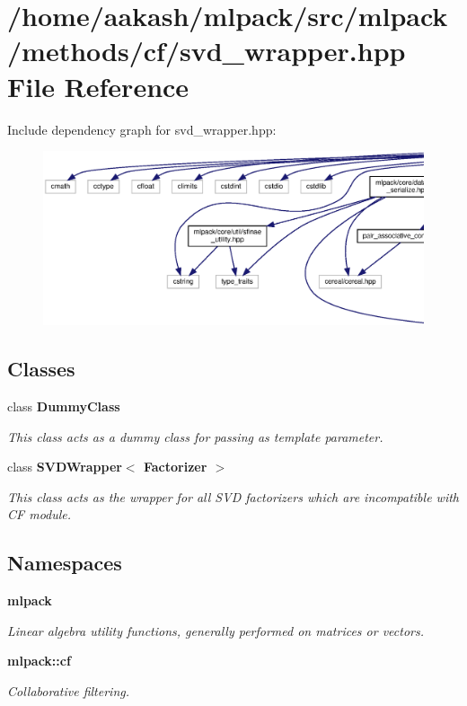 \section{/home/aakash/mlpack/src/mlpack/methods/cf/svd\+\_\+wrapper.hpp File Reference}
\label{svd__wrapper_8hpp}
Include dependency graph for svd\+\_\+wrapper.\+hpp\+:
\nopagebreak
\begin{figure}[H]
\begin{center}
\leavevmode
\includegraphics[width=350pt]{svd__wrapper_8hpp__incl}
\end{center}
\end{figure}
\subsection*{Classes}
\begin{DoxyCompactItemize}
\item 
class \textbf{ Dummy\+Class}
\begin{DoxyCompactList}\small\item\em This class acts as a dummy class for passing as template parameter. \end{DoxyCompactList}\item 
class \textbf{ S\+V\+D\+Wrapper$<$ Factorizer $>$}
\begin{DoxyCompactList}\small\item\em This class acts as the wrapper for all S\+VD factorizers which are incompatible with CF module. \end{DoxyCompactList}\end{DoxyCompactItemize}
\subsection*{Namespaces}
\begin{DoxyCompactItemize}
\item 
 \textbf{ mlpack}
\begin{DoxyCompactList}\small\item\em Linear algebra utility functions, generally performed on matrices or vectors. \end{DoxyCompactList}\item 
 \textbf{ mlpack\+::cf}
\begin{DoxyCompactList}\small\item\em Collaborative filtering. \end{DoxyCompactList}\end{DoxyCompactItemize}
